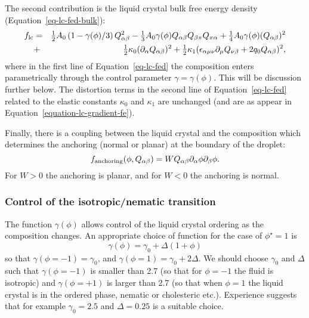The second contribution is the liquid crystal bulk free energy density
(Equation~\ref{eq-lc-fed-bulk}):
\begin{eqnarray}
f_{\rm lc} &=&
  {\textstyle\frac{1}{2}}A_0 \left(1-\gamma(\phi)/3\right) Q_{\alpha\beta}^2
- {\textstyle\frac{1}{3}}A_0 \gamma(\phi)
  Q_{\alpha\beta} Q_{\beta\pi} Q_{\pi\alpha}
+ {\textstyle\frac{1}{4}} A_0 \gamma(\phi) (Q_{\alpha\beta})^2\nonumber\\
&+&{\textstyle\frac{1}{2}} \kappa_0 (\partial_\alpha Q_{\alpha\beta})^2
+ {\textstyle\frac{1}{2}} \kappa_1
(\epsilon_{\alpha\mu\nu} \partial_\mu Q_{\nu\beta} + 2q_0 Q_{\alpha\beta})^2,
\label{eq-lc-fed}
\end{eqnarray}
where in the first line of Equation~\ref{eq-lc-fed} the composition enters parametrically through the control
parameter $\gamma = \gamma(\phi)$. This will be discussion further
below. The distortion terms in the
second line of Equation~\ref{eq-lc-fed} related to the elastic constants $\kappa_0$ and $\kappa_1$
are unchanged (and are as appear in Equation~\ref{equation-lc-gradient-fe}).

Finally, there is a coupling between the liquid crystal and the
composition which determines the anchoring (normal or planar) at
the boundary of the droplet:
\begin{equation}
f_{\rm anchoring}(\phi,Q_{\alpha\beta}) =
W Q_{\alpha\beta}\partial_{\alpha}\phi\partial_{\beta}\phi.
\end{equation}
For $W>0$ the anchoring is planar, and for $W<0$ the anchoring is normal.

\subsubsection{Control of the isotropic/nematic transition}
The function $\gamma(\phi)$ allows control of the liquid crystal
ordering as the composition changes. An appropriate choice of function
for the case of $\phi^\star = 1$ is
\begin{equation}
\gamma(\phi)=\gamma_0+\Delta\left(1+\phi\right)
\end{equation}
so that $\gamma(\phi=-1)=\gamma_0$, and $\gamma(\phi=1)=\gamma_0+2\Delta$.
We should choose $\gamma_0$ and $\Delta$ such that $\gamma(\phi=-1)$ 
is smaller than 2.7 (so that for $\phi=-1$ the fluid is isotropic)
and $\gamma(\phi=+1)$ is larger than 2.7 (so that when $\phi=1$ the
liquid crystal is in the ordered phase, nematic or cholesteric etc.).
Experience suggests that for example 
$\gamma_0=2.5$ and $\Delta=0.25$ is a suitable choice.

